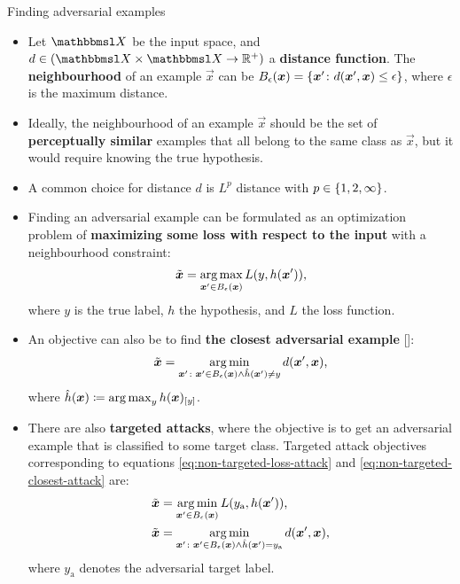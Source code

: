 \documentclass{beamer}
\newcommand{\citep}[1]{{\color{citecolor}\relscale{0.8}[\textcite{#1}]}}
\begin{document}
\begin{frame}[allowframebreaks=0.9]{Finding adversarial examples}
\begin{itemize}
	\item Let $\set X$ be the input space,
	and $d\in(\set X\times\set X\to \R^+)$ a \textbf{distance function}. The \textbf{neighbourhood} of an example $\vec x$ can be $B_{\epsilon}(\vec x) = \cbr{\vec x'\colon d(\vec x', \vec x) \leq \epsilon}$,
	where $\epsilon$ is the maximum distance.
	
	\item Ideally, the neighbourhood of an example $\vec x$ should be the set of \textbf{perceptually similar} examples that all belong to the same class as $\vec x$, but it would require knowing the true hypothesis.
	\item A common choice for distance $d$ is $L^p$ distance with $p\in\cbr{1,2,\infty}$.
	
	\item Finding an adversarial example can be formulated as an optimization problem of \textbf{maximizing some loss with respect to the input} with a neighbourhood constraint:
	\begin{align}
	\tilde{\vec x} = \argmax_{\vec x'\in B_\epsilon(\vec x)} L(y, h(\vec x')) \text{,} \label{eq:non-targeted-loss-attack}
	\end{align}
	where $y$ is the true label, $h$ the hypothesis, and $L$ the loss function. 
	\item An objective can also be to find \textbf{the closest adversarial example} \citep{Moosavi-Dezfooli:2016:DFSAMFDNN}:
	\begin{align}
	\tilde{\vec x} = \argmin_{\vec x'\colon \vec x'\in B_\epsilon(\vec x) \land \hat{h}(\vec x') \neq y} d(\vec x', \vec x) \text{,} \label{eq:non-targeted-closest-attack}
	\end{align}
	where $\hat{h}(\vec x) \coloneqq \argmax_{y} h(\vec x)_\ind{y}$.
	\item There are also \textbf{targeted attacks}, where the objective is to get an adversarial example that is classified to some target class. Targeted attack objectives corresponding to equations \eqref{eq:non-targeted-loss-attack} and \eqref{eq:non-targeted-closest-attack} are:
	\begin{align}
	\tilde{\vec x} &= \argmin_{\vec x'\in B_\epsilon(\vec x)} L(y_\text{a}, h(\vec x')) \text{,} \label{eq:targeted-loss-attack} \\
	\tilde{\vec x} &= \argmin_{\vec x'\colon \vec x'\in B_\epsilon(\vec x) \land \hat{h}(\vec x') = y_\text{a}} d(\vec x', \vec x) \text{,} \label{eq:targeted-closest-attack}
	\end{align}
	where $y_\text{a}$ denotes the adversarial target label. 
\end{itemize}
\end{frame}
\end{document}
